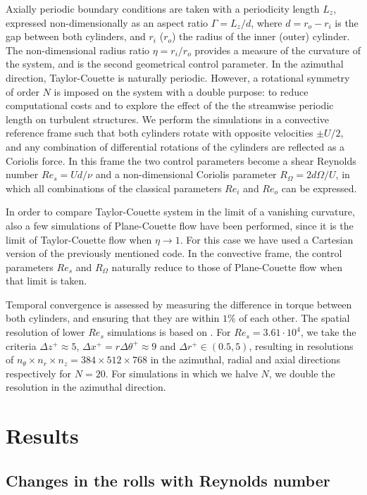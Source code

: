 \documentclass{jfm}
\begin{document}
Axially periodic boundary conditions are taken with a periodicity length $L_z$, expressed non-dimensionally as an aspect ratio $\Gamma=L_z/d$, where $d=r_o-r_i$ is the gap between both cylinders, and $r_i$ ($r_o$) the radius of the inner (outer) cylinder. The non-dimensional radius ratio $\eta=r_i/r_o$ provides a measure of the curvature of the system, and is the second geometrical control parameter. In the azimuthal direction, Taylor-Couette is naturally periodic. However, a rotational symmetry of order $N$ is imposed on the system with a double purpose: to reduce computational costs and to explore the effect of the the streamwise periodic length on turbulent structures. We perform the simulations in a convective reference frame \citep{dub05} such that both cylinders rotate with opposite velocities $\pm U/2$, and any combination of differential rotations of the cylinders are  reflected as a Coriolis force. In this frame the two control parameters become a shear Reynolds number $Re_s=Ud/\nu$ and a non-dimensional Coriolis parameter $R_\Omega=2d\Omega /U$, in which all combinations of the classical parameters $Re_i$ and $Re_o$ can be expressed.

In order to compare Taylor-Couette system in the limit of a vanishing curvature, also a few simulations of Plane-Couette flow have been performed, since it is the limit of Taylor-Couette flow when $\eta\to 1$. For this case we have used a Cartesian version of the previously mentioned code. In the convective frame, the control parameters $Re_s$ and $R_\Omega$ naturally reduce to those of Plane-Couette flow when that limit is taken.

Temporal convergence is assessed by measuring the difference in torque between both cylinders, and ensuring that they are within $1\% $ of each other. The spatial resolution of lower $Re_s$ simulations is based on \cite{ost14}. For $Re_s=3.61\cdot 10^4$, we take the criteria $\Delta z^+\approx 5$, $\Delta x^+ = r\Delta \theta^+\approx 9$ and $\Delta r^+\in (0.5,5)$, resulting in resolutions of $n_\theta\times n_r\times n_z = 384 \times 512 \times 768$ in the azimuthal, radial and axial directions respectively for $N=20$. For simulations in which we halve $N$, we double the resolution in the azimuthal direction.

\section{Results}
\label{sec:results}

\subsection{Changes in the rolls with Reynolds number}
\label{subsec:LSE}
\end{document}
